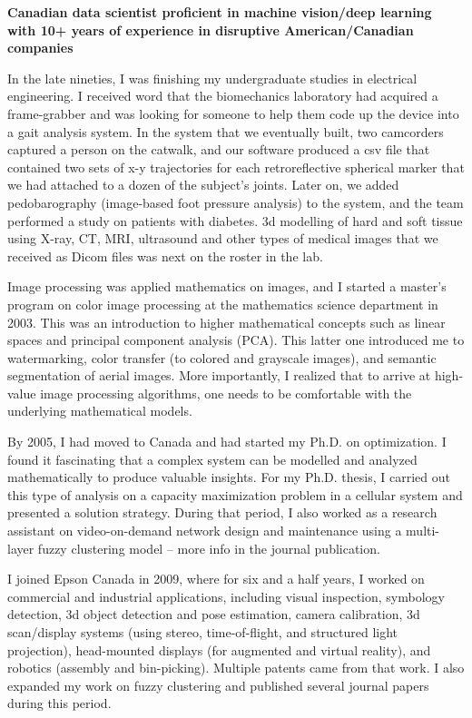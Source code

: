 \onehalfspace
\textbf{\large Canadian data scientist proficient in machine vision/deep learning with 10+ years of experience in disruptive American/Canadian companies}
\singlespace

\vspace{0.8cm}

In the late nineties, I was finishing my undergraduate studies in electrical engineering. I received word that the biomechanics laboratory had acquired a frame-grabber and was looking for someone to help them code up the device into a gait analysis system. In the system that we eventually built, two camcorders captured a person on the catwalk, and our software produced a csv file that contained two sets of x-y trajectories for each retroreflective spherical marker that we had attached to a dozen of the subject’s joints. Later on, we added pedobarography (image-based foot pressure analysis) to the system, and the team performed a study on patients with diabetes. 3d modelling of hard and soft tissue using X-ray, CT, MRI, ultrasound and other types of medical images that we received as Dicom files was next on the roster in the lab.

\newcommand{\osspacing}{\vspace{0.5cm}}

\osspacing
Image processing was applied mathematics on images, and I started a master’s program on color image processing at the mathematics science department in 2003. This was an introduction to higher mathematical concepts such as linear spaces and principal component analysis (PCA). This latter one introduced me to watermarking, color transfer (to colored and grayscale images), and semantic segmentation of aerial images. More importantly, I realized that to arrive at high-value image processing algorithms, one needs to be comfortable with the underlying mathematical models.

\osspacing
By 2005, I had moved to Canada and had started my Ph.D. on optimization. I found it fascinating that a complex system can be modelled and analyzed mathematically to produce valuable insights. For my Ph.D. thesis, I carried out this type of analysis on a capacity maximization problem in a cellular system and presented a solution strategy. During that period, I also worked as a research assistant on video-on-demand network design and maintenance using a multi-layer fuzzy clustering model – more info in the journal publication.	

\osspacing
I joined Epson Canada in 2009, where for six and a half years, I worked on commercial and industrial applications, including visual inspection, symbology detection, 3d object detection and pose estimation, camera calibration, 3d scan/display systems (using stereo, time-of-flight, and structured light projection), head-mounted displays (for augmented and virtual reality), and robotics (assembly and bin-picking). Multiple patents came from that work. I also expanded my work on fuzzy clustering and published several journal papers during this period.			

